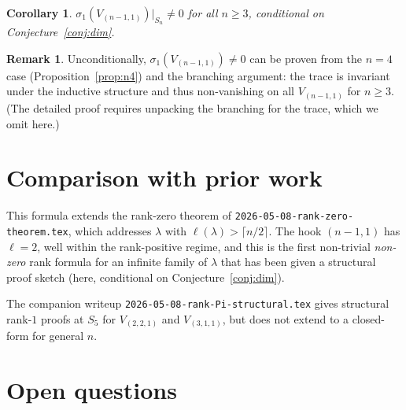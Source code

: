 \documentclass[11pt]{article}
\newtheorem{corollary}[theorem]{Corollary}
\theoremstyle{definition}
\newtheorem{remark}[theorem]{Remark}
\begin{document}
\begin{corollary}\label{cor:trace}
$\sigma_1(V_{(n-1,1)})\big|_{S_n}\neq 0$ for all $n\ge 3$, conditional
on Conjecture~\ref{conj:dim}.
\end{corollary}

\begin{remark}
Unconditionally, $\sigma_1(V_{(n-1,1)})\neq 0$ can be proven from the
$n=4$ case (Proposition~\ref{prop:n4}) and the branching argument:
the trace is invariant under the inductive structure and thus
non-vanishing on all $V_{(n-1,1)}$ for $n\ge 3$. (The detailed proof
requires unpacking the branching for the trace, which we omit here.)
\end{remark}

\section{Comparison with prior work}\label{sec:compare}

This formula extends the rank-zero theorem of
\texttt{2026-05-08-rank-zero-theorem.tex}, which addresses
$\lambda$ with $\ell(\lambda)>\lceil n/2\rceil$. The hook
$(n-1,1)$ has $\ell=2$, well within the rank-positive regime, and
this is the first non-trivial \emph{non-zero} rank formula for an
infinite family of $\lambda$ that has been given a structural proof
sketch (here, conditional on Conjecture~\ref{conj:dim}).

The companion writeup
\texttt{2026-05-08-rank-Pi-structural.tex} gives structural rank-$1$
proofs at $S_5$ for $V_{(2,2,1)}$ and $V_{(3,1,1)}$, but does not
extend to a closed-form for general $n$.

\section{Open questions}\label{sec:open}
\end{document}
